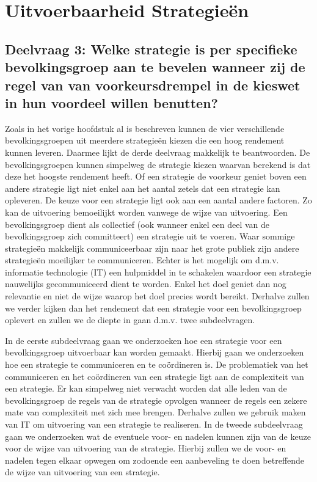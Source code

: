 \newpage
\section{Uitvoerbaarheid Strategie\"{e}n}
\label{h6}

\subsection*{Deelvraag 3: Welke strategie is per specifieke bevolkingsgroep aan te bevelen wanneer zij de regel van van voorkeursdrempel in de kieswet in hun voordeel willen benutten?}
Zoals in het vorige hoofdstuk al is beschreven kunnen de vier verschillende bevolkingsgroepen uit meerdere strategie\"{e}n kiezen die een hoog rendement kunnen leveren. Daarmee lijkt de derde deelvraag makkelijk te beantwoorden. De bevolkingsgroepen kunnen simpelweg de strategie kiezen waarvan berekend is dat deze het hoogste rendement heeft. Of een strategie de voorkeur geniet boven een andere strategie ligt niet enkel aan het aantal zetels dat een strategie kan opleveren. De keuze voor een strategie ligt ook aan een aantal andere factoren. Zo kan de uitvoering bemoeilijkt worden vanwege de wijze van uitvoering. Een bevolkingsgroep dient als collectief (ook wanneer enkel een deel van de bevolkingsgroep zich committeert) een strategie uit te voeren. Waar sommige strategie\"{e}n makkelijk communiceerbaar zijn naar het grote publiek zijn andere strategie\"{e}n moeilijker te communiceren. Echter is het mogelijk om d.m.v. informatie technologie (IT) een hulpmiddel in te schakelen waardoor een strategie nauwelijks gecommuniceerd dient te worden. Enkel het doel geniet dan nog relevantie en niet de wijze waarop het doel precies wordt bereikt. Derhalve zullen we verder kijken dan het rendement dat een strategie voor een bevolkingsgroep oplevert en zullen we de diepte in gaan d.m.v. twee subdeelvragen. 

In de eerste subdeelvraag gaan we onderzoeken hoe een strategie voor een bevolkingsgroep uitvoerbaar kan worden gemaakt. Hierbij gaan we onderzoeken hoe een strategie te communiceren en te co\"{o}rdineren is. De problematiek van het communiceren en het co\"{o}rdineren van een strategie ligt aan de complexiteit van een strategie. Er kan simpelweg niet verwacht worden dat alle leden van de bevolkingsgroep de regels van de strategie opvolgen wanneer de regels een zekere mate van complexiteit met zich mee brengen. Derhalve zullen we gebruik maken van IT om uitvoering van een strategie te realiseren. In de tweede subdeelvraag gaan we onderzoeken wat de eventuele voor- en nadelen kunnen zijn van de keuze voor de wijze van uitvoering van de strategie. Hierbij zullen we de voor- en nadelen tegen elkaar opwegen om zodoende een aanbeveling te doen betreffende de wijze van uitvoering van een strategie.  


